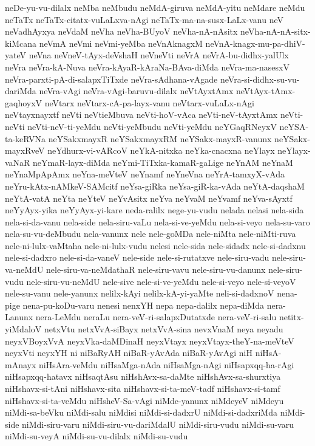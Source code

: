 {neDe-yu-vu-dilalx
neMba
neMbudu
neMdA-giruva
neMdA-yitu
neMdare
neMdu
neTaTx
neTaTx-citatx-vuLaLxva-nAgi
neTaTx-ma-na-susx-LaLx-vanu
neV
neVadhAyxya
neVdaM
neVha
neVha-BUyoV
neVha-nA-nAsitx
neVha-nA-nA-sitx-kiMcana
neVmA
neVmi
neVmi-yeMba
neVnAknagxM
neVnA-knagx-mu-pa-dhiV-yateV
neVna
neVneV-tAyx-deVshaH
neVneVti
neVrA
neVrA-bu-didhx-yalUlx
neVra
neVra-kA-Nuva
neVra-kAyaR-kAraNa-BAva-diMda
neVra-ma-nasesxV
neVra-parxti-pA-di-salapxTiTxde
neVra-sAdhana-vAgade
neVra-si-didhx-su-vu-dariMda
neVra-vAgi
neVra-vAgi-baruvu-dilalx
neVtAyxtAmx
neVtAyx-tAmx-gaqhoyxV
neVtarx
neVtarx-cA-pa-layx-vanu
neVtarx-vuLaLx-nAgi
neVtayxnayxtf
neVti
neVtieMbuva
neVti-hoV-vAca
neVti-neV-tAyxtAmx
neVti-neVti
neVti-neV-ti-yeMdu
neVti-yeMbudu
neVti-yeMdu
neYGaqRNeyxV
neYSA-ta-keRVNa
neYSakxmayxR
neYSakxmayxRM
neYSakx-mayxR-vanunx
neYSakx-mayxRveV
neYdhurx-vi-vARcoV
neYkA-nitxka
neYka-cnacxna
neYlayx
neYlayx-vaNaR
neYmaR-layx-diMda
neYmi-TiTxka-kamaR-gaLige
neYnAM
neYnaM
neYnaMpApAmx
neYna-meVteV
neYnamf
neYneVna
neYrA-tamxyX-vAda
neYru-kAtx-nAMkeV-SAMcitf
neYsa-giRka
neYsa-giR-ka-vAda
neYtA-daqshaM
neYtA-vatA
neYta
neYteV
neYvAsitx
neYva
neYvaM
neYvamf
neYva-sAyxtf
neYyAyx-yika
neYyAyx-yi-kare
neda-ralilx
nege-yu-vudu
nelada
nelasi
nela-sida
nela-si-da-vanu
nela-side
nela-siru-vaLu
nela-si-ve-yeMdu
nela-si-veyo
nela-su-varo
nela-su-vu-deMbudu
nela-vanunx
nele
nele-goMDa
nele-niMta
nele-niMti-ruva
nele-ni-lulx-vaMtaha
nele-ni-lulx-vudu
nelesi
nele-sida
nele-sidadx
nele-si-dadxnu
nele-si-dadxro
nele-si-da-vaneV
nele-side
nele-si-rutatxve
nele-siru-vadu
nele-siru-va-neMdU
nele-siru-va-neMdathaR
nele-siru-vavu
nele-siru-vu-danunx
nele-siru-vudu
nele-siru-vu-neMdU
nele-sive
nele-si-ve-yeMdu
nele-si-veyo
nele-si-veyoV
nele-su-vanu
nele-yanunx
nelilx-kAyi
nelilx-kA-yi-yaMte
neli-si-dadxnoV
nena-pige
nena-pu-koDu-varu
nenesi
nenxYH
nepa
nepa-dalilx
nepa-diMda
nera-Lanunx
nera-LeMdu
neraLu
nera-veV-ri-salapxDutatxde
nera-veV-ri-salu
netitx-yiMdaloV
netxVtu
netxVvA-siBayx
netxVvA-sina
nevxVnaM
neya
neyadu
neyxVBoyxVvA
neyxVka-daMDinaH
neyxVtayx
neyxVtayx-theY-na-meVteV
neyxVti
neyxYH
ni
niBaRyAH
niBaR-yAvAda
niBaR-yAvAgi
niH
niHsA-mAnayx
niHsAra-veMdu
niHsaMga-nAda
niHsaMga-nAgi
niHsapxqq-ha-rAgi
niHsapxqq-hatavx
niHsaqtAsu
niHshAvx-sa-daMte
niHshAvx-sa-shurxtiya
niHshavx-si-tAni
niHshavx-sita
niHshavx-si-ta-meV-tadf
niHshavx-si-tamf
niHshavx-si-ta-veMdu
niHsheV-Sa-vAgi
niMde-yanunx
niMdeyeV
niMdeyu
niMdi-sa-beVku
niMdi-salu
niMdisi
niMdi-si-dadxrU
niMdi-si-dadxriMda
niMdi-side
niMdi-siru-varu
niMdi-siru-vu-dariMdalU
niMdi-siru-vudu
niMdi-su-varu
niMdi-su-veyA
niMdi-su-vu-dilalx
niMdi-su-vudu
}

